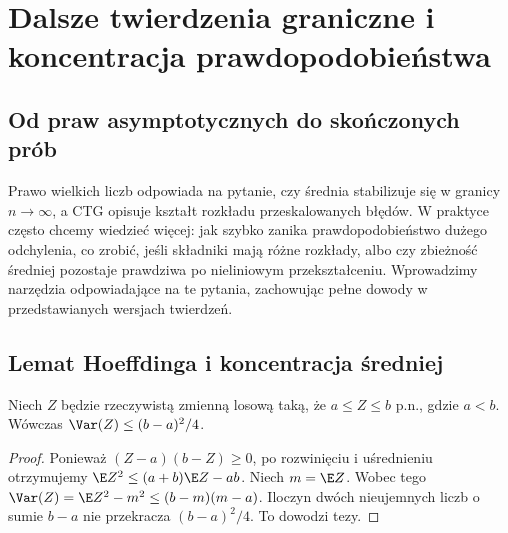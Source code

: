 \chapter{Dalsze twierdzenia graniczne i koncentracja prawdopodobieństwa}
\label{ch:advancedlimits}

\section{Od praw asymptotycznych do skończonych prób}

Prawo wielkich liczb odpowiada na pytanie, czy średnia
stabilizuje się w granicy $n\to\infty$, a CTG opisuje
kształt rozkładu przeskalowanych błędów. W praktyce
często chcemy wiedzieć więcej: jak szybko zanika
prawdopodobieństwo dużego odchylenia, co zrobić, jeśli
składniki mają różne rozkłady, albo czy zbieżność
średniej pozostaje prawdziwa po nieliniowym
przekształceniu. Wprowadzimy narzędzia
odpowiadające na te pytania, zachowując pełne
dowody w przedstawianych wersjach twierdzeń.

\section{Lemat Hoeffdinga i koncentracja średniej}

\begin{lemat}
Niech $Z$ będzie rzeczywistą zmienną losową taką,
że $a\leq Z\leq b$ p.n., gdzie $a<b$.
Wówczas $\Var(Z)\leq(b-a)^2/4$.
\end{lemat}
\begin{proof}
Ponieważ $(Z-a)(b-Z)\geq0$, po rozwinięciu
i uśrednieniu otrzymujemy
$\E Z^2\leq(a+b)\E Z-ab$.
Niech $m=\E Z$. Wobec tego
$\Var(Z)=\E Z^2-m^2\leq(b-m)(m-a)$.
Iloczyn dwóch nieujemnych liczb o sumie $b-a$
nie przekracza $(b-a)^2/4$. To dowodzi tezy.
\end{proof}

